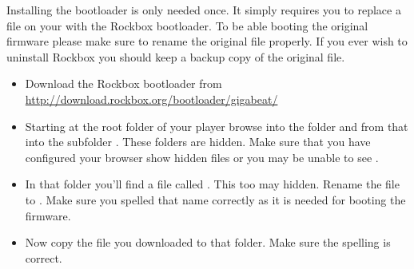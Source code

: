 
Installing the bootloader is only needed once. It simply requires you
to replace a file on your \dap{} with the Rockbox bootloader. To be able
booting the original firmware please make sure to rename the original file
properly. If you ever wish to uninstall Rockbox you should keep a backup copy
of the original file.

\begin{itemize}
\item Download the Rockbox bootloader from
  \url{http://download.rockbox.org/bootloader/gigabeat/}
\item Starting at the root folder of your player browse into the folder
   and from that into the subfolder .
  These folders are hidden. Make sure that you have configured your browser
  show hidden files or you may be unable to see .
\item In that folder you'll find a file called . This too
  may hidden. Rename the file to . Make sure you
  spelled that name  correctly as it is needed for booting the \playerman{} firmware.
\item Now copy the file  you downloaded to that folder.
  Make sure the spelling is correct.
\end{itemize}

